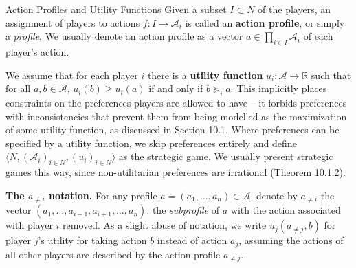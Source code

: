 \documentclass[aspectratio=169,10pt]{beamer}
\newcommand{\R}{\mathbb{R}}
\newcommand{\Ac}{\mathcal{A}}
\begin{document}
\begin{frame}{Action Profiles and Utility Functions}
  Given a subset $I\subset N$ of the players, an assignment of players to
  actions $f:I\to\Ac_i$ is called an \textbf{action profile}, or simply a
  \emph{profile}. We usually denote an action profile as a vector
  $a\in\prod_{i\in I}\Ac_i$ of each player's action.

  \vspace{0.4em}
  We assume that for each player $i$ there is a \textbf{utility function}
  $u_i:\Ac\to\R$ such that for all $a,b\in\Ac$, $u_i(b)\geq u_i(a)$ if and
  only if $b\succeq_i a$. This implicitly places constraints on the
  preferences players are allowed to have -- it forbids preferences with
  inconsistencies that prevent them from being modelled as the
  maximization of some utility function, as discussed in Section 10.1.
  Where preferences can be specified by a utility function, we skip
  preferences entirely and define $\langle N,(\Ac_i)_{i\in N},(u_i)_{i\in
  N}\rangle$ as the strategic game. We usually present strategic games
  this way, since non-utilitarian preferences are irrational
  (Theorem 10.1.2).

  \vspace{0.4em}
  \textbf{The $a_{\neq i}$ notation.} For any profile
  $a=(a_1,\ldots,a_n)\in\Ac$, denote by $a_{\neq i}$ the vector
  $(a_1,\ldots,a_{i-1},a_{i+1},\ldots,a_n)$: the \emph{subprofile} of $a$
  with the action associated with player $i$ removed. As a slight abuse of
  notation, we write $u_j(a_{\neq j},b)$ for player $j$'s utility for
  taking action $b$ instead of action $a_j$, assuming the actions of all
  other players are described by the action profile $a_{\neq j}$.
\end{frame}
\end{document}
